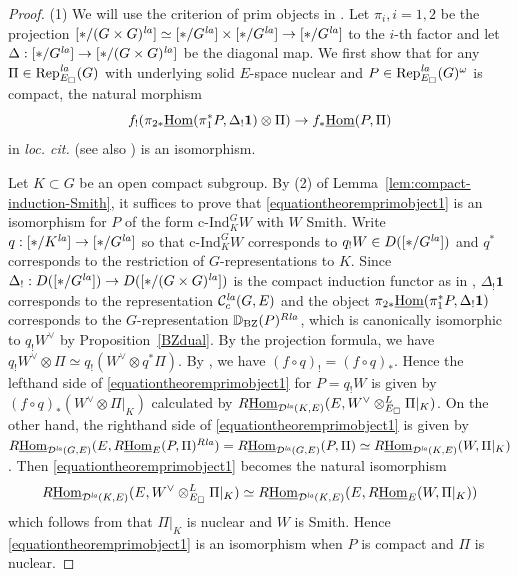 \documentclass[a4paper,10pt]{amsart}
\theoremstyle{remark}
\theoremstyle{definition}
\theoremstyle{plain}
\numberwithin{equation}{section}
\newcommand{\bbD}{{\mathbb D}}
\newcommand{\calC}{{\mathcal C}}
\newcommand{\calD}{{\mathcal D}}
\newcommand{\Hom}{{\rm Hom}}
\newcommand{\uHom}{\underline{\Hom}}
\newcommand{\la}{{\it la}}
\newcommand{\Rep}{{\rm Rep}}
\newcommand{\cInd}{\mathrm{c\text{-}Ind}}
\newcommand{\BZ}{\ensuremath{\mathrm{BZ}}}
\begin{document}
\begin{proof}
	(1) We will use the criterion of prim objects in \cite[Lem.~4.4.6]{heyer20246functor}. Let $\pi_i,i=1,2$ be the projection $[*/(G\times G)^{\la}]\simeq [*/G^{\la}]\times [*/G^{\la}]\to [*/G^{\la}]$ to the $i$-th factor and let $\Delta:[*/G^{\la}]\to [*/(G\times G)^{\la}]$ be the diagonal map. We first show that for any $\Pi\in \Rep^{\la}_{E_{\square}}(G)$ with underlying solid $E$-space nuclear and $P\in \Rep^{\la}_{E_{\square}}(G)^{\omega}$ is compact, the natural morphism
	\begin{equation}\label{equationtheoremprimobject1}
		f_!(\pi_{2*}\uHom(\pi_1^*P,\Delta_!\mathbf{1})\otimes \Pi)\rightarrow f_*\uHom(P,\Pi)
	\end{equation}
	in \textit{loc. cit.} (see also \cite[Prop.~6.9]{scholze2025six}) is an isomorphism. 
	
	Let $K\subset G$ be an open compact subgroup. By (2) of Lemma~\ref{lem:compact-induction-Smith}, it suffices to prove that \eqref{equationtheoremprimobject1} is an isomorphism for $P$ of the form $\cInd_K^GW$ with $W$ Smith. Write $q:[*/K^{\la}]\to [*/G^{\la}]$ so that  $\cInd_K^GW$ corresponds to $q_!W\in D([*/G^{\la}])$ and $q^*$ corresponds to the restriction of $G$-representations to $K$. Since $\Delta_!:D([*/G^{\la}])\to D([*/(G\times G)^{\la}])$ is the compact induction functor as in \cite[\S~5.4]{heyer20246functor}, $\Delta_!\mathbf{1}$ corresponds to the representation $\calC_c^{\la}(G,E)$ and the object $\pi_{2*}\uHom(\pi_1^*P,\Delta_!\mathbf{1})$ corresponds to the $G$-representation $\bbD_{\BZ}(P)^{R\la}$, which is canonically isomorphic to $q_!W^{\vee}$ by Proposition~\ref{BZdual}. By the projection formula, we have $q_!W^{\vee}\otimes \Pi\simeq q_!(W^{\vee}\otimes q^*\Pi)$. By \cite[Prop.~2.39]{mikami2026finiteness}, we have $(f\circ q)_!=(f\circ q)_*$. Hence the lefthand side of \eqref{equationtheoremprimobject1} for $P=q_!W$ is given by $(f\circ q)_*( W^{\vee}\otimes \Pi|_K)$ calculated by $R\uHom_{\calD^{\la}(K,E)}(E,W^{\vee}\otimes_{E_{\square}}^L \Pi|_K)$. On the other hand, the righthand side of \eqref{equationtheoremprimobject1} is given by $R\uHom_{\calD^{\la}(G,E)}(E, R\uHom_{E}(P,\Pi)^{R\la})=R\uHom_{\calD^{\la}(G,E)}(P,\Pi)\simeq R\uHom_{\calD^{\la}(K,E)}(W,\Pi|_K)$. Then \eqref{equationtheoremprimobject1} becomes the natural isomorphism
	\[R\uHom_{\calD^{\la}(K,E)}(E,W^{\vee}\otimes_{E_{\square}}^L \Pi|_K)\simeq R\uHom_{\calD^{\la}(K,E)}(E,R\uHom_E(W, \Pi|_K))\]
	which follows from that $\Pi|_K$ is nuclear and $W$ is Smith. Hence \eqref{equationtheoremprimobject1} is an isomorphism when $P$ is compact and $\Pi$ is nuclear.


\end{proof}
\end{document}
